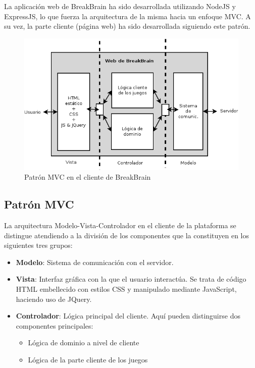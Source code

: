 La aplicación web de BreakBrain ha sido desarrollada utilizando NodeJS y ExpressJS, lo que fuerza la arquitectura de la misma hacia un enfoque \acf{MVC}. A su vez, la parte cliente (página web) ha sido desarrollada siguiendo este patrón.

\begin{figure}[H]
  \begin{center}
    \includegraphics[width=\textwidth]{images/mvc-cliente.png}
    \caption{Patrón MVC en el cliente de BreakBrain}
    \label{fig::mvc-cliente}
  \end{center}
\end{figure}

\subsection{Patrón MVC}

La arquitectura Modelo-Vista-Controlador en el cliente de la plataforma se distingue atendiendo a la división de los componentes que la constituyen en los siguientes tres grupos:

\begin{itemize}
\item {\bf Modelo}: Sistema de comunicación con el servidor.

\item {\bf Vista}: Interfaz gráfica con la que el usuario interactúa. Se trata de código \acs{HTML} embellecido con estilos \acs{CSS} y manipulado mediante JavaScript, haciendo uso de JQuery.

\item {\bf Controlador}: Lógica principal del cliente. Aquí pueden distinguirse dos componentes principales:

  \begin{itemize}
  \item Lógica de dominio a nivel de cliente
  \item Lógica de la parte cliente de los juegos
  \end{itemize}
\end{itemize}

